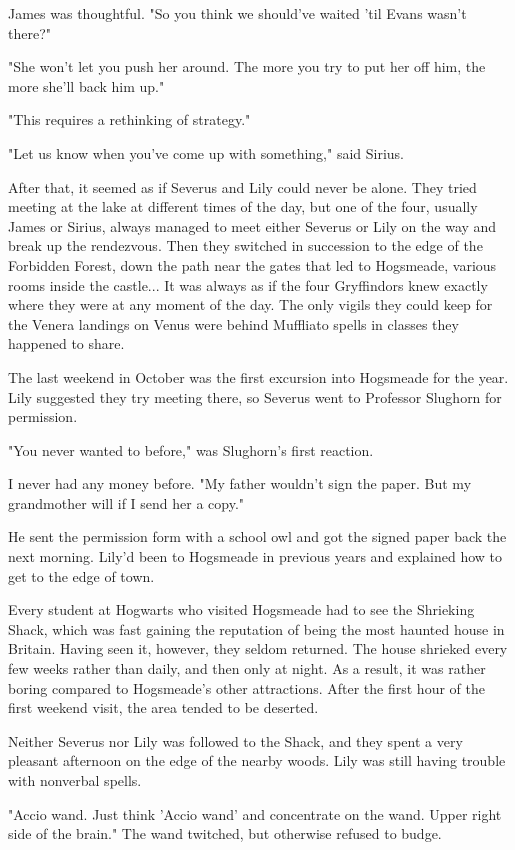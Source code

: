 \documentclass[a4paper,11pt]{article}
\begin{document}
James was thoughtful. "So you think we should've waited 'til Evans wasn't there?"

"She won't let you push her around. The more you try to put her off him, the more she'll back him up."

"This requires a rethinking of strategy."

"Let us know when you've come up with something," said Sirius.

After that, it seemed as if Severus and Lily could never be alone. They tried meeting at the lake at different times of the day, but one of the four, usually James or Sirius, always managed to meet either Severus or Lily on the way and break up the rendezvous. Then they switched in succession to the edge of the Forbidden Forest, down the path near the gates that led to Hogsmeade, various rooms inside the castle... It was always as if the four Gryffindors knew exactly where they were at any moment of the day. The only vigils they could keep for the Venera landings on Venus were behind Muffliato spells in classes they happened to share.

The last weekend in October was the first excursion into Hogsmeade for the year. Lily suggested they try meeting there, so Severus went to Professor Slughorn for permission.

"You never wanted to before," was Slughorn's first reaction.

I never had any money before. "My father wouldn't sign the paper. But my grandmother will if I send her a copy."

He sent the permission form with a school owl and got the signed paper back the next morning. Lily'd been to Hogsmeade in previous years and explained how to get to the edge of town.

Every student at Hogwarts who visited Hogsmeade had to see the Shrieking Shack, which was fast gaining the reputation of being the most haunted house in Britain. Having seen it, however, they seldom returned. The house shrieked every few weeks rather than daily, and then only at night. As a result, it was rather boring compared to Hogsmeade's other attractions. After the first hour of the first weekend visit, the area tended to be deserted.

Neither Severus nor Lily was followed to the Shack, and they spent a very pleasant afternoon on the edge of the nearby woods. Lily was still having trouble with nonverbal spells.

"Accio wand. Just think 'Accio wand' and concentrate on the wand. Upper right side of the brain." The wand twitched, but otherwise refused to budge.
\end{document}
